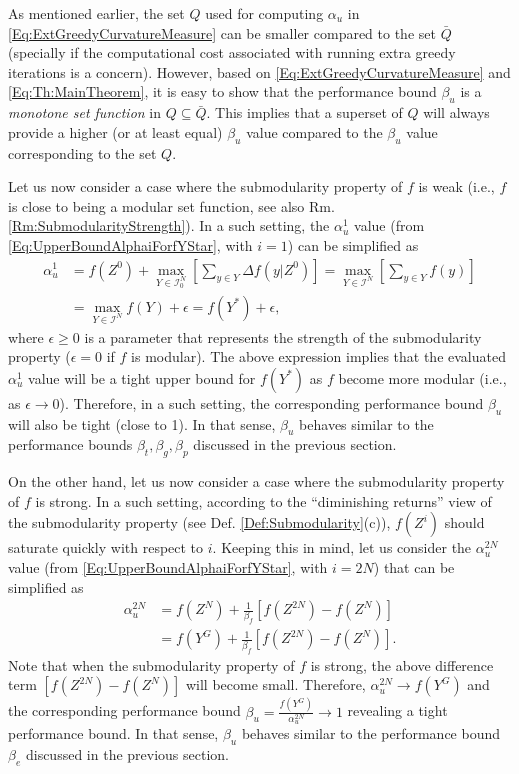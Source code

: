\documentclass[conference]{IEEEtran}
\begin{document}
As mentioned earlier, the set $Q$ used for computing $\alpha_u$ in \eqref{Eq:ExtGreedyCurvatureMeasure} can be smaller compared to the set $\bar{Q}$ (specially if the computational cost associated with running extra greedy iterations is a concern). However, based on \eqref{Eq:ExtGreedyCurvatureMeasure} and \eqref{Eq:Th:MainTheorem}, it is easy to show that the performance bound $\beta_u$ is a \emph{monotone set function} in $Q \subseteq \bar{Q}$. This implies that a superset of $Q$ will always provide a higher (or at least equal) $\beta_u$ value compared to the $\beta_u$ value corresponding to the set $Q$.



Let us now consider a case where the submodularity property of $f$ is weak (i.e., $f$ is close to being a modular set function, see also Rm. \ref{Rm:SubmodularityStrength}). In a such setting, the $\alpha^1_u$ value (from \eqref{Eq:UpperBoundAlphaiForfYStar}, with $i=1$) can be simplified as
\begin{align}
    \alpha_u^1 
    &= f(Z^0)+\underset{Y\in\mathcal{I}^N_0}{\max}\left[\sum_{y\in Y}\Delta f(y\vert Z^0)\right] 
    = \underset{Y \in \mathcal{I}^N}{\max} \left[\sum_{y\in Y} f(y) \right]\nonumber \\
    &= \underset{Y \in \mathcal{I}^N}{\max} f(Y) + \epsilon = f(Y^*) + \epsilon, \nonumber
\end{align}
where $\epsilon\geq0$ is a parameter that represents the strength of the submodularity property ($\epsilon = 0$ if $f$ is modular). The above expression implies that the evaluated $\alpha_u^1$ value will be a tight upper bound for $f(Y^*)$ as $f$ become more modular (i.e., as $\epsilon\rightarrow 0$). Therefore, in a such setting, the corresponding performance bound $\beta_u$ will also be tight (close to 1). In that sense, $\beta_u$ behaves similar to the performance bounds $\beta_t,\beta_g,\beta_p$ discussed in the previous section. 



On the other hand, let us now consider a case where the submodularity property of $f$ is strong. In a such setting, according to the ``diminishing returns'' view of the submodularity property (see Def. \ref{Def:Submodularity}(c)), $f(Z^i)$ should saturate quickly with respect to $i$. Keeping this in mind, let us consider the $\alpha^{2N}_u$ value (from \eqref{Eq:UpperBoundAlphaiForfYStar}, with $i=2N$) that can be simplified as 
\begin{align}
    \alpha^{2N}_u &= f(Z^N) + \frac{1}{\beta_f}\left[f(Z^{2N})-f(Z^{N})\right]\nonumber\\ 
    &= f(Y^G) + \frac{1}{\beta_f}\left[f(Z^{2N})-f(Z^{N})\right].\nonumber
\end{align}
Note that when the submodularity property of $f$ is strong, the above difference term $\left[f(Z^{2N})-f(Z^{N})\right]$ will become small. Therefore, $\alpha_u^{2N}\rightarrow f(Y^G)$ and the corresponding performance bound $\beta_u = \frac{f(Y^G)}{\alpha_u^{2N}}\rightarrow 1$ revealing a tight performance bound. In that sense, $\beta_u$ behaves similar to the performance bound $\beta_e$ discussed in the previous section. 
\end{document}
